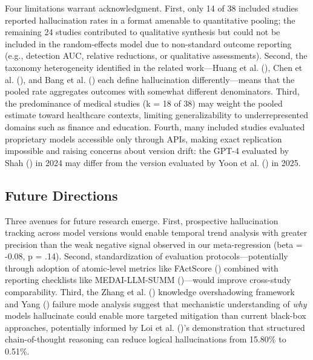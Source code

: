 \documentclass[
  11pt,
  a4paper,
]{article}
\begin{document}
Four limitations warrant acknowledgment. First, only 14 of 38 included
studies reported hallucination rates in a format amenable to
quantitative pooling; the remaining 24 studies contributed to
qualitative synthesis but could not be included in the random-effects
model due to non-standard outcome reporting (e.g., detection AUC,
relative reductions, or qualitative assessments). Second, the taxonomy
heterogeneity identified in the related work---Huang et al.
(), Chen et al.
(), and Bang et al.
() each define hallucination
differently---means that the pooled rate aggregates outcomes with
somewhat different denominators. Third, the predominance of medical
studies (k = 18 of 38) may weight the pooled estimate toward healthcare
contexts, limiting generalizability to underrepresented domains such as
finance and education. Fourth, many included studies evaluated
proprietary models accessible only through APIs, making exact
replication impossible and raising concerns about version drift: the
GPT-4 evaluated by Shah () in 2024 may
differ from the version evaluated by Yoon et al.
() in 2025.

\subsection{Future Directions}\label{future-directions}

Three avenues for future research emerge. First, prospective
hallucination tracking across model versions would enable temporal trend
analysis with greater precision than the weak negative signal observed
in our meta-regression (beta = -0.08, p = .14). Second, standardization
of evaluation protocols---potentially through adoption of atomic-level
metrics like FActScore ()
combined with reporting checklists like MEDAI-LLM-SUMM
()---would improve
cross-study comparability. Third, the Zhang et al.
() knowledge overshadowing framework and
Yang () failure mode analysis suggest that
mechanistic understanding of \emph{why} models hallucinate could enable
more targeted mitigation than current black-box approaches, potentially
informed by Loi et al. ()'s demonstration
that structured chain-of-thought reasoning can reduce logical
hallucinations from 15.80\% to 0.51\%.
\end{document}
